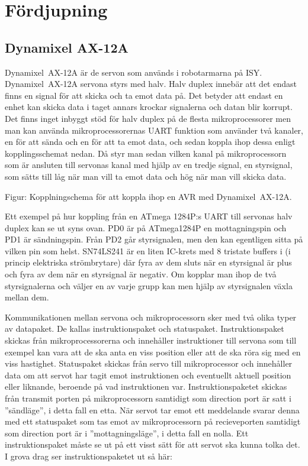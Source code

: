 \documentclass[a4paper,12pt]{article}
\begin{document}
 
\section{Fördjupning}
 
\subsection{Dynamixel AX-12A}
 
Dynamixel~AX-12A är de servon som används i robotarmarna på ISY. Dynamixel~AX-12A servona styrs med halv. Halv duplex innebär att det endast finns en signal för att skicka och ta emot data på. Det betyder att endast en enhet kan skicka data i taget annars krockar signalerna och datan blir korrupt. Det finns inget inbyggt stöd för halv duplex på de flesta mikroprocessorer men man kan använda mikroprocessorernas UART funktion som använder två kanaler, en för att sända och en för att ta emot data, och sedan koppla ihop dessa enligt kopplingsschemat nedan. Då styr man sedan vilken kanal på mikroprocessorn som är ansluten till servonas kanal med hjälp av en tredje signal, en styrsignal,  som sätts till låg när man vill ta emot data och hög när man vill skicka data. 
 
                      Figur: Kopplningschema för att koppla ihop en AVR med Dynamixel~AX-12A.
 
Ett exempel på hur koppling från en ATmega 1284P:s UART till servonas halv duplex kan se ut syns ovan. PD0 är på ATmega1284P en mottagningspin och PD1 är sändningspin. Från PD2 går styrsignalen, men den kan egentligen sitta på vilken pin som helst. SN74LS241 är en liten IC-krets med 8 tristate buffers i (i princip elektriska strömbrytare) där fyra av dem sluts när en styrsignal är plus och fyra av dem när en styrsignal är negativ. Om kopplar man ihop de två styrsignalerna och väljer en av varje grupp kan men hjälp av styrsignalen växla mellan dem.\cite{dyn-manual}
 
Kommunikationen mellan servona och mikroprocessorn sker med två olika typer av datapaket. De kallas instruktionspaket och statuspaket. Instruktionspaket skickas från mikroprocessorerna och innehåller instruktioner till servona som till exempel kan vara att de ska anta en viss position eller att de ska röra sig med en viss hastighet. Statuspaket skickas från servo till mikroprocessor och innehåller data om att servot har tagit emot instruktionen och eventuellt aktuell position eller liknande, beroende på vad instruktionen var. Instruktionspaketet skickas från transmit porten på mikroprocessorn samtidigt som direction port är satt i ''sändläge'', i detta fall en etta. När servot tar emot ett meddelande svarar denna med ett statuspaket som tas emot av mikroprocessorn på recieveporten samtidigt som direction port är i ''mottagningsläge'', i detta fall en nolla. Ett instruktionspaket måste se ut på ett visst sätt för att servot ska kunna tolka det. I grova drag ser instruktionspaketet ut så här:
 
\end{document}
